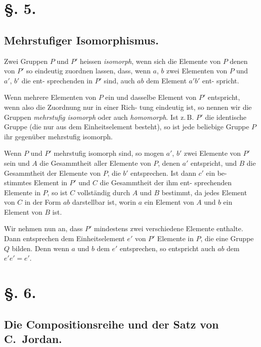 \documentclass[12pt,a4paper]{article}
\theoremstyle{plain}
\theoremstyle{definition}
\theoremstyle{remark}
\begin{document}
\newpage

\section*{\S. 5.}
\subsection*{Mehrstufiger Isomorphismus.}

Zwei Gruppen $P$ und $P'$ heissen \emph{isomorph}, wenn sich die
Elemente von $P$ denen von $P'$ so eindeutig zuordnen lassen,
dass, wenn $a$, $b$ zwei Elementen von $P$ und $a'$, $b'$ die ent-
sprechenden in $P'$ sind, auch $ab$ dem Element $a'b'$ ent-
spricht.

Wenn mehrere Elementen von $P$ ein und dasselbe Element
von $P'$ entspricht, wenn also die Zuordnung nur in einer Rich-
tung eindeutig ist, so nennen wir die Gruppen \emph{mehrstufig isomorph}
oder auch \emph{homomorph}. Ist z.\,B. $P'$ die identische Gruppe (die
nur aus dem Einheitselement besteht), so ist jede beliebige
Gruppe $P$ ihr gegenüber mehrstufig isomorph.

Wenn $P$ und $P'$ mehrstufig isomorph sind, so mogen $a'$,
$b'$ zwei Elemente von $P'$ sein und $A$ die Gesammtheit aller
Elemente von $P$, denen $a'$ entspricht, und $B$ die Gesammtheit
der Elemente von $P$, die $b'$ entsprechen. Ist dann $c'$ ein be-
stimmtes Element in $P'$ und $C$ die Gesammtheit der ihm ent-
sprechenden Elemente in $P$, so ist $C$ vollständig durch $A$ und
$B$ bestimmt, da jedes Element von $C$ in der Form $ab$ darstellbar
ist, worin $a$ ein Element von $A$ und $b$ ein Element von $B$ ist.

Wir nehmen nun an, dass $P'$ mindestens zwei verschiedene
Elemente enthalte. Dann entsprechen dem Einheitselement $e'$
von $P'$ Elemente in $P$, die eine Gruppe $Q$ bilden. Denn wenn
$a$ und $b$ dem $e'$ entsprechen, so entspricht auch $ab$ dem $e'e' = e'$.

\newpage

\section*{\S. 6.}
\subsection*{Die Compositionsreihe und der Satz von C.~Jordan.}
\end{document}
